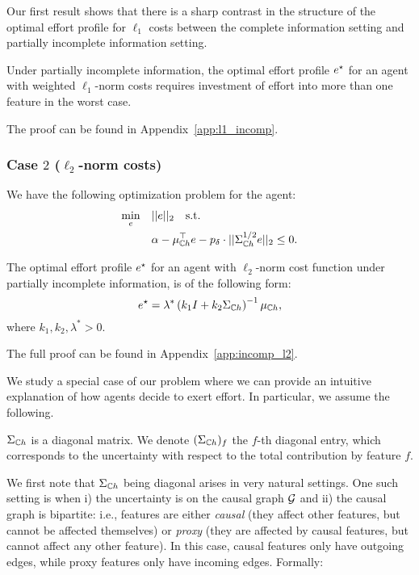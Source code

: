 Our first result shows that there is a sharp contrast in the structure of the optimal effort profile for $\ell_1$ costs between the complete information setting and partially incomplete information setting.  
\begin{lem}\label{lem:l1_incomp}
Under partially incomplete information, the optimal effort profile $e^{\star}$ for an agent with weighted $\ell_1$-norm costs requires investment of effort into more than one feature in the worst case.  
\end{lem}


The proof can be found in Appendix~\ref{app:l1_incomp}. 



\subsubsection{Case $2$ ($\ell_2$-norm costs)}
We have the following optimization problem for the agent: 
\begin{align*}
    \min_{e} \quad &||e||_2 \quad \text{s.t.}\\
    & \alpha - \mu_{\mathbb{C} h}^{\top}e - p_{\delta}\cdot ||\Sigma_{\mathbb{C} h}^{1/2}e||_2 \leq 0.
\end{align*}
\begin{thm}\label{thm:incomp_l2}
The optimal effort profile $e^{\star}$ for an agent with $\ell_2$-norm cost function under partially incomplete information, is of the following form: 
\[
       e^{\star} = \lambda^* \left(k_1 I + k_2 \Sigma_{\mathbb{C} h} \right)^{-1}\mu_{\mathbb{C} h},
\]
where $k_1, k_2, \lambda^* > 0$. 
\end{thm}


The full proof can be found in Appendix~\ref{app:incomp_l2}.


We study a special case of our problem where we can provide an intuitive explanation of how agents decide to exert effort. In particular, we assume the following. 
\begin{aspt}
$\Sigma_{\mathbb{C} h}$ is a diagonal matrix. We denote $(\Sigma_{\mathbb{C} h})_f$ the $f$-th diagonal entry, which corresponds to the uncertainty with respect to the total contribution by feature $f$.
\end{aspt}

We first note that $\Sigma_{\mathbb{C} h}$ being diagonal arises in very natural settings. One such setting is when i) the uncertainty is on the causal graph $\mathcal{G}$ and ii) the causal graph is bipartite: i.e., features are either \emph{causal} (they affect other features, but cannot be affected themselves) or \emph{proxy} (they are affected by causal features, but cannot affect any other feature). In this case, causal features only have outgoing edges, while proxy features only have incoming edges. Formally: 

